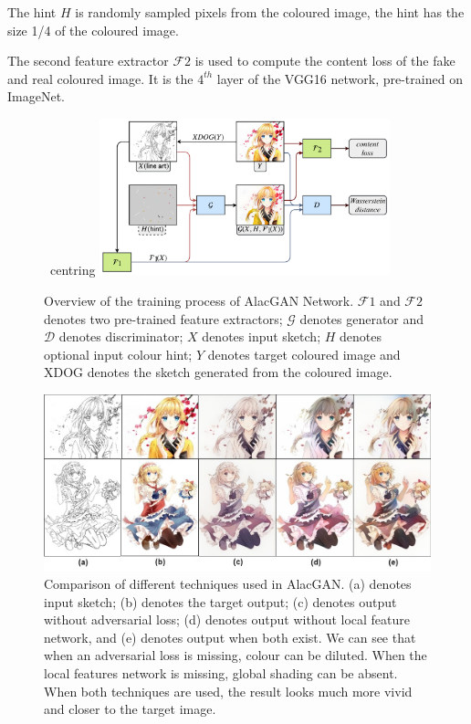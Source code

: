 The hint $H$ is randomly sampled pixels from the coloured image, the hint has the size 1/4 of the coloured image.

The second feature extractor $\mathcal{F}2$ is used to compute the content loss of the fake and real coloured image. It is the $4^{th}$ layer of the VGG16 network, pre-trained on ImageNet\cite{ImageNet}.

\begin{figure}
    \ centring
    \includegraphics[width=0.75\textwidth]{images/colorization/alacgan_train.png}
    \caption{Overview of the training process of AlacGAN Network. $\mathcal{F}1$ and $\mathcal{F}2$ denotes two pre-trained feature extractors; $\mathcal{G}$ denotes generator and $\mathcal{D}$ denotes discriminator; $X$ denotes input sketch; $H$ denotes optional input colour hint; $Y$ denotes target coloured image and XDOG denotes the sketch generated from the coloured image.} 
    \label{fig:alacgan_train}
\end{figure}

\begin{figure}
    \centering
    \includegraphics[width=1.0\textwidth]{images/colorization/alacgan_features.jpg}
    \caption{Comparison of different techniques used in AlacGAN. (a) denotes input sketch; (b) denotes the target output; (c) denotes output without adversarial loss; (d) denotes output without local feature network, and (e) denotes output when both exist. We can see that when an adversarial loss is missing, colour can be diluted. When the local features network is missing, global shading can be absent. When both techniques are used, the result looks much more vivid and closer to the target image.} 
    \label{fig:alacgan_features}
\end{figure}

